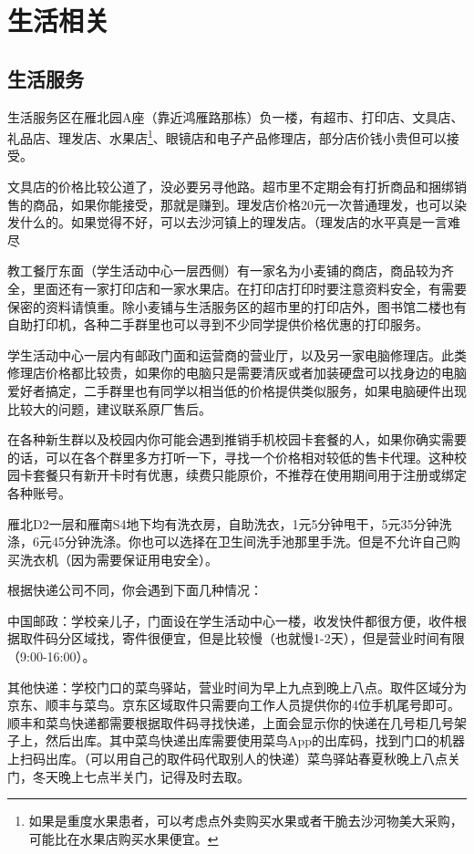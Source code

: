 \section{生活相关}

\subsection{生活服务}


生活服务区在雁北园A座（靠近鸿雁路那栋）负一楼，有超市、打印店、文具店、礼品店、理发店、水果店\footnote{如果是重度水果患者，可以考虑点外卖购买水果或者干脆去沙河物美大采购，可能比在水果店购买水果便宜。}、眼镜店和电子产品修理店，部分店价钱小贵但可以接受。

文具店的价格比较公道了，没必要另寻他路。超市里不定期会有打折商品和捆绑销售的商品，如果你能接受，那就是赚到。理发店价格20元一次普通理发，也可以染发什么的。如果觉得不好，可以去沙河镇上的理发店。（理发店的水平真是一言难尽

教工餐厅东面（学生活动中心一层西侧）有一家名为小麦铺的商店，商品较为齐全，里面还有一家打印店和一家水果店。在打印店打印时要注意资料安全，有需要保密的资料请慎重。除小麦铺与生活服务区的超市里的打印店外，图书馆二楼也有自助打印机，各种二手群里也可以寻到不少同学提供价格优惠的打印服务。

学生活动中心一层内有邮政门面和运营商的营业厅，以及另一家电脑修理店。此类修理店价格都比较贵，如果你的电脑只是需要清灰或者加装硬盘可以找身边的电脑爱好者搞定，二手群里也有同学以相当低的价格提供类似服务，如果电脑硬件出现比较大的问题，建议联系原厂售后。

在各种新生群以及校园内你可能会遇到推销手机校园卡套餐的人，如果你确实需要的话，可以在各个群里多方打听一下，寻找一个价格相对较低的售卡代理。这种校园卡套餐只有新开卡时有优惠，续费只能原价，不推荐在使用期间用于注册或绑定各种账号。


雁北D2一层和雁南S4地下均有洗衣房，自助洗衣，1元5分钟甩干，5元35分钟洗涤，6元45分钟洗涤。你也可以选择在卫生间洗手池那里手洗。但是不允许自己购买洗衣机（因为需要保证用电安全）。


根据快递公司不同，你会遇到下面几种情况：

中国邮政：学校亲儿子，门面设在学生活动中心一楼，收发快件都很方便，收件根据取件码分区域找，寄件很便宜，但是比较慢（也就慢1-2天），但是营业时间有限（9:00-16:00）。

其他快递：学校门口的菜鸟驿站，营业时间为早上九点到晚上八点。取件区域分为京东、顺丰与菜鸟。京东区域取件只需要向工作人员提供你的4位手机尾号即可。顺丰和菜鸟快递都需要根据取件码寻找快递，上面会显示你的快递在几号柜几号架子上，然后出库。其中菜鸟快递出库需要使用菜鸟App的出库码，找到门口的机器上扫码出库。（可以用自己的取件码代取别人的快递）菜鸟驿站春夏秋晚上八点关门，冬天晚上七点半关门，记得及时去取。


